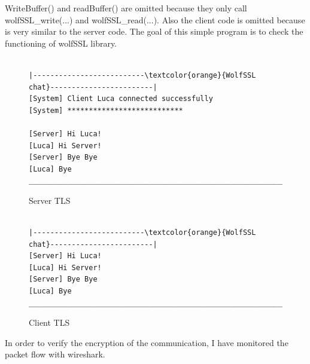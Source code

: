 \documentclass[a4paper,12pt]{article}
\begin{document}
WriteBuffer() and readBuffer() are omitted because they only call wolfSSL\_write(...) and wolfSSL\_read(...).
Also the client code is omitted because is very similar to the server code.
The goal of this simple program is to check the functioning of wolfSSL library. 

\begin{figure}[H]
\begin{Verbatim}[commandchars=\\\{\}]

|--------------------------\textcolor{orange}{WolfSSL chat}------------------------|
[System] Client Luca connected successfully                           
[System] ***************************                                        
 	 	                                                                                       
[Server] Hi Luca!                                                                       
[Luca] Hi Server!                                                                       
[Server] Bye Bye                                                                       
[Luca] Bye                                                                                 
______________________________________________________________|
\end{Verbatim}
\caption{Server TLS}
\end{figure}
\begin{figure}[H]
\begin{Verbatim}[commandchars=\\\{\}]

|--------------------------\textcolor{orange}{WolfSSL chat}------------------------|                                    	 	                                                                                       
[Server] Hi Luca!                                                                       
[Luca] Hi Server!                                                                       
[Server] Bye Bye                                                                       
[Luca] Bye                                                                                 
______________________________________________________________|
\end{Verbatim}
\caption{Client TLS}
\end{figure}

In order to verify the encryption of the communication, I have monitored the packet flow with wireshark.
\end{document}
